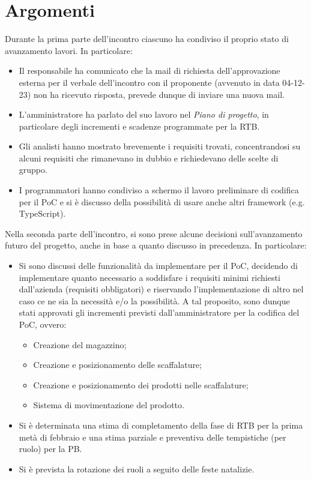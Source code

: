 \section{Argomenti}
Durante la prima parte dell'incontro ciascuno ha condiviso il proprio stato di avanzamento lavori. In particolare:
\begin{itemize}
    \item Il responsabile ha comunicato che la mail di richiesta dell'approvazione esterna per il verbale dell'incontro con il proponente (avvenuto in data 04-12-23) non ha ricevuto risposta, prevede dunque di inviare una nuova mail.
    \item L'amministratore ha parlato del suo lavoro nel \textit{Piano di progetto}, in particolare degli incrementi e scadenze programmate per la RTB.
    \item Gli analisti hanno mostrato brevemente i requisiti trovati, concentrandosi su alcuni requisiti che rimanevano in dubbio e richiedevano delle scelte di gruppo.
    \item I programmatori hanno condiviso a schermo il lavoro preliminare di codifica per il PoC e si è discusso della possibilità di usare anche altri framework (e.g. TypeScript).
\end{itemize}

\noindent Nella seconda parte dell'incontro, si sono prese alcune decisioni sull'avanzamento futuro del progetto, anche in base a quanto discusso in precedenza. In particolare:
\begin{itemize}
    \item Si sono discussi delle funzionalità da implementare per il PoC, decidendo di implementare quanto necessario a soddisfare i requisiti minimi richiesti dall'azienda (requisiti obbligatori) e riservando l'implementazione di altro nel caso ce ne sia la necessità e/o la possibilità. A tal proposito, sono dunque stati  approvati gli incrementi previsti dall'amministratore per la codifica del PoC, ovvero: 
    \begin{itemize}
        \item Creazione del magazzino;
        \item Creazione e posizionamento delle scaffalature;
        \item Creazione e posizionamento dei prodotti nelle scaffalature;
        \item Sistema di movimentazione del prodotto.
    \end{itemize}
    \item Si è determinata una stima di completamento della fase di RTB per la prima metà di febbraio e una stima parziale e preventiva delle tempistiche (per ruolo) per la PB.
    \item Si è prevista la rotazione dei ruoli a seguito delle feste natalizie.
\end{itemize}


